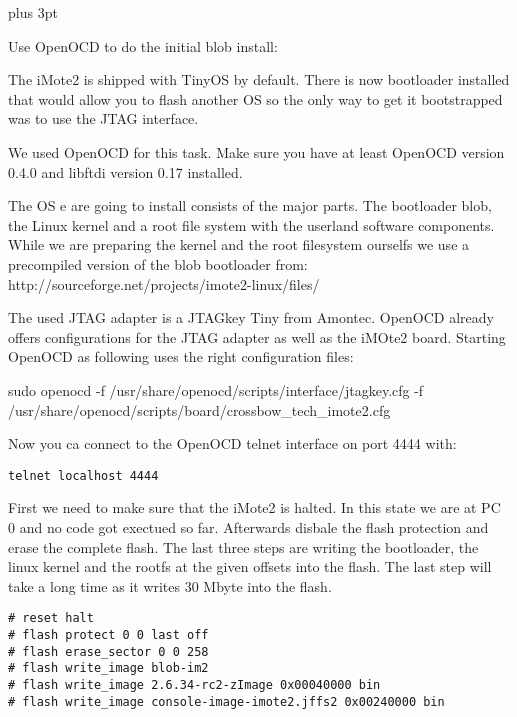 \parindent=0pt                   %
\parskip=6pt plus 3pt            %

Use OpenOCD to do the initial blob install:

The iMote2 is shipped with TinyOS by default. There is now bootloader installed
that would allow you to flash another OS so the only way to get it bootstrapped
was to use the JTAG interface.

We used OpenOCD for this task. Make sure you have at least OpenOCD version 0.4.0
and libftdi version 0.17 installed.

The OS e are going to install consists of the major parts. The bootloader blob, the
Linux kernel and a root file system with the userland software components. While
we are preparing the kernel and the root filesystem ourselfs we use a
precompiled version of the blob bootloader from:
http://sourceforge.net/projects/imote2-linux/files/

The used JTAG adapter is a JTAGkey Tiny from Amontec. OpenOCD already offers
configurations for the JTAG adapter as well as the iMOte2 board. Starting
OpenOCD as following uses the right configuration files:

sudo openocd -f /usr/share/openocd/scripts/interface/jtagkey.cfg -f \\
/usr/share/openocd/scripts/board/crossbow\_tech\_imote2.cfg

Now you ca connect to the OpenOCD telnet interface on port 4444 with:

\begin{verbatim}
telnet localhost 4444
\end{verbatim}

First we need to make sure that the iMote2 is halted. In this state we are at PC
0 and no code got exectued so far. Afterwards disbale the flash protection and
erase the complete flash. The last three steps are writing the bootloader, the
linux kernel and the rootfs at the given offsets into the flash. The last step
will take a long time as it writes 30 Mbyte into the flash.

\begin{verbatim}
# reset halt
# flash protect 0 0 last off
# flash erase_sector 0 0 258
# flash write_image blob-im2
# flash write_image 2.6.34-rc2-zImage 0x00040000 bin
# flash write_image console-image-imote2.jffs2 0x00240000 bin
\end{verbatim}
